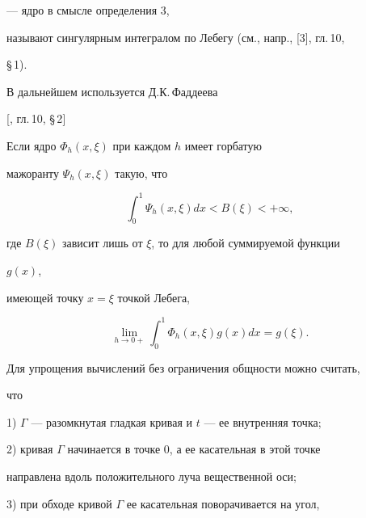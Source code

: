 --- ядро в смысле определения 3, 


называют сингулярным интегралом по Лебегу (см., напр., [3], гл.\,10, 


\S\,1). 


 


В дальнейшем используется Д.К.\,Фаддеева


 


\begin{thmnonum} 


[{\selectfont [3], гл.\,10, \S\,2}] 


Если ядро $\Phi_h(x,\xi)$ при каждом $h$ имеет горбатую 


мажоранту $\Psi_h(x,\xi)$ такую, что 


\begin{equation} 


\int^1_0\Psi_h(x,\xi)dx<B(\xi)<+\infty, 


\end{equation} 


где $B(\xi)$ зависит лишь от $\xi$, то для любой суммируемой функции 


$g(x)$, 


имеющей точку $x=\xi$ точкой Лебега, 


\begin{equation} 


\lim_{h\to0+}\int^1_0\Phi_h(x,\xi)g(x)dx=g(\xi). 


\end{equation} 


\end{thmnonum} 


 


Для упрощения вычислений без ограничения общности можно считать, 


что 


 


1) $\Gamma$ --- разомкнутая гладкая кривая и $t$ --- ее внутренняя точка; 


 


2) кривая $\Gamma$ начинается в точке 0, а ее касательная в этой точке 


направлена вдоль положительного луча вещественной оси; 


 


3) при обходе кривой $\Gamma$ ее касательная поворачивается на угол, 


